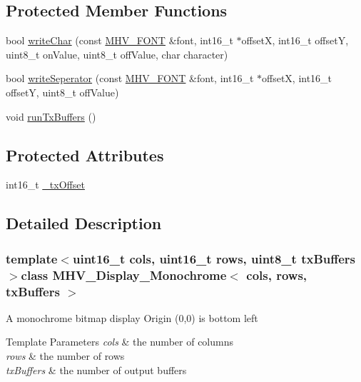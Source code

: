 \subsection*{Protected Member Functions}
\begin{DoxyCompactItemize}
\item 
bool \hyperlink{class_m_h_v___display___monochrome_af156075f92b308ebf680eb8df148b4fc}{write\-Char} (const \hyperlink{_m_h_v___font_8h_ab7088ba808ac223275dfd526d198356f}{M\-H\-V\-\_\-\-F\-O\-N\-T} \&font, int16\-\_\-t $\ast$offset\-X, int16\-\_\-t offset\-Y, uint8\-\_\-t on\-Value, uint8\-\_\-t off\-Value, char character)
\item 
bool \hyperlink{class_m_h_v___display___monochrome_a8a807db6448120988f81ec5d9bee9a60}{write\-Seperator} (const \hyperlink{_m_h_v___font_8h_ab7088ba808ac223275dfd526d198356f}{M\-H\-V\-\_\-\-F\-O\-N\-T} \&font, int16\-\_\-t $\ast$offset\-X, int16\-\_\-t offset\-Y, uint8\-\_\-t off\-Value)
\item 
void \hyperlink{class_m_h_v___display___monochrome_a38380e2d43210b58bef9a50280019d51}{run\-Tx\-Buffers} ()
\end{DoxyCompactItemize}
\subsection*{Protected Attributes}
\begin{DoxyCompactItemize}
\item 
int16\-\_\-t \hyperlink{class_m_h_v___display___monochrome_a4abea2d9c872bf4ef8dda9cd752fd387}{\-\_\-tx\-Offset}
\end{DoxyCompactItemize}


\subsection{Detailed Description}
\subsubsection*{template$<$uint16\-\_\-t cols, uint16\-\_\-t rows, uint8\-\_\-t tx\-Buffers$>$class M\-H\-V\-\_\-\-Display\-\_\-\-Monochrome$<$ cols, rows, tx\-Buffers $>$}

A monochrome bitmap display Origin (0,0) is bottom left 
\begin{DoxyTemplParams}{Template Parameters}
{\em cols} & the number of columns \\
\hline
{\em rows} & the number of rows \\
\hline
{\em tx\-Buffers} & the number of output buffers \\
\hline
\end{DoxyTemplParams}


